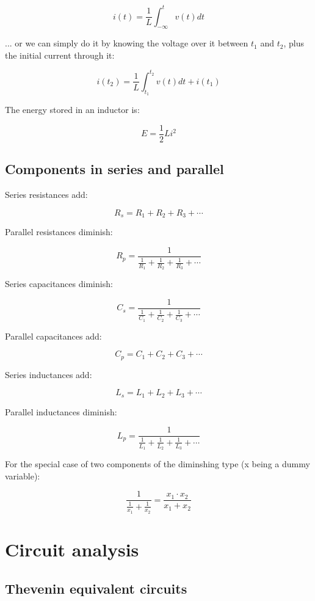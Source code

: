 \documentclass[12pt,a4paper]{report}
\begin{document}
\[ i(t) = \frac{1}{L} \int_{-\infty}^t v(t) dt \]

... or we can simply do it by knowing the voltage over it between $t_1$ and $t_2$, plus the initial current through it:

\[ i(t_2) = \frac{1}{L} \int_{t_1}^{t_2} v(t) dt + i(t_1) \]

The energy stored in an inductor is:

\[ E = \frac{1}{2} L i^2 \]

\newpage

\section{Components in series and parallel}

Series resistances add:

\[ R_s = R_1 + R_2 + R_3 + \cdots \]

Parallel resistances diminish:

\[ R_p = \frac{1}{ \frac{1}{R_1} + \frac{1}{R_2} + \frac{1}{R_3} + \cdots} \]

Series capacitances diminish:

\[ C_s = \frac{1}{ \frac{1}{C_1} + \frac{1}{C_2} + \frac{1}{C_3} + \cdots} \]

Parallel capacitances add:

\[ C_p = C_1 + C_2 + C_3 + \cdots \]

Series inductances add:

\[ L_s = L_1 + L_2 + L_3 + \cdots \]

Parallel inductances diminish:

\[ L_p = \frac{1}{ \frac{1}{L_1} + \frac{1}{L_2} + \frac{1}{L_3} + \cdots} \]

For the special case of two components of the diminshing type (x being a dummy variable):

\[ \frac{1}{ \frac{1}{x_1} + \frac{1}{x_2} } = \frac{x_1 \cdot x_2}{x_1 + x_2} \]

%


\chapter{Circuit analysis}

\section{Thevenin equivalent circuits}
\end{document}

